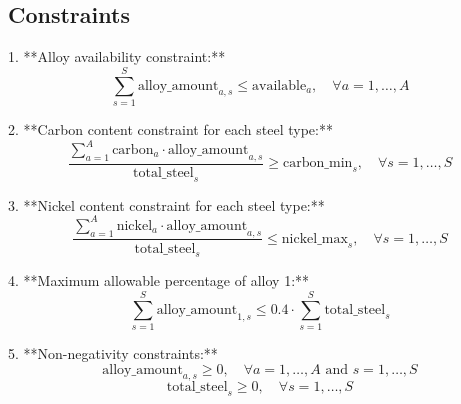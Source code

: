 \documentclass{article}
\begin{document}
\subsection*{Constraints}
1. **Alloy availability constraint:**
\[
\sum_{s=1}^{S} \text{alloy\_amount}_{a,s} \leq \text{available}_{a}, \quad \forall a = 1, \ldots, A
\]
   
2. **Carbon content constraint for each steel type:**
\[
\frac{\sum_{a=1}^{A} \text{carbon}_{a} \cdot \text{alloy\_amount}_{a,s}}{\text{total\_steel}_{s}} \geq \text{carbon\_min}_{s}, \quad \forall s = 1, \ldots, S
\]

3. **Nickel content constraint for each steel type:**
\[
\frac{\sum_{a=1}^{A} \text{nickel}_{a} \cdot \text{alloy\_amount}_{a,s}}{\text{total\_steel}_{s}} \leq \text{nickel\_max}_{s}, \quad \forall s = 1, \ldots, S
\]

4. **Maximum allowable percentage of alloy 1:**
\[
\sum_{s=1}^{S} \text{alloy\_amount}_{1,s} \leq 0.4 \cdot \sum_{s=1}^{S} \text{total\_steel}_{s}
\]

5. **Non-negativity constraints:**
\[
\text{alloy\_amount}_{a,s} \geq 0, \quad \forall a = 1, \ldots, A \text{ and } s = 1, \ldots, S
\]
\[
\text{total\_steel}_{s} \geq 0, \quad \forall s = 1, \ldots, S
\]
\end{document}
